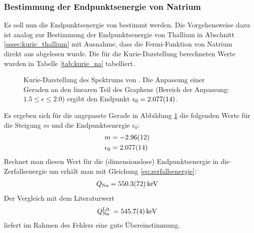 \documentclass[11pt, a4paper]{article}
\numberwithin{equation}{section}
\begin{document}
\subsubsection{Bestimmung der Endpunktsenergie von Natrium}
Es soll nun die Endpunktsenergie von  bestimmt werden.
Die Vorgehensweise dazu ist analog zur Bestimmung der Endpunktsenergie von Thallium in Abschnitt \ref{sssec:kurie_thallium} mit Ausnahme, dass die Fermi-Funktion von Natrium direkt aus \cite{riezler} abgelesen wurde.
Die für die Kurie-Darstellung berechneten Werte wurden in Tabelle \ref{tab:kurie_na} tabelliert.
\begin{figure}[h]
	\centering
	
	\caption{Kurie-Darstellung des Spektrums von . Die Anpassung einer Geraden an den linearen Teil des Graphens (Bereich der Anpassung: $\num{1.5} \leq \epsilon \leq {2.0}$) ergibt den Endpunkt $\epsilon_0 = \num{2.077 +- 0.014}$.}
	\label{fig:natrium_kurie}
\end{figure}
Es ergeben sich für die angepasste Gerade in Abbildung \ref{fig:natrium_kurie} die folgenden Werte für die Steigung $m$ und die Endpunktsenergie $\epsilon_0$:
\begin{align*}
	m &= \num{-2.96+- 0.12} \\
	\epsilon_0 &= \num{2.077 +- 0.014}
\end{align*}
Rechnet man diesen Wert für die (dimensionslose) Endpunktsenergie in die Zerfallsenergie um erhält man mit Gleichung \ref{eq:zerfallsenergie}:
\begin{align*}
Q_\mathrm{Na} = \SI{550.3+-7.2}{\kilo\electronvolt}
\end{align*}
Der Vergleich mit dem Literaturwert \cite{na_literatur}
\begin{align*}
	Q^{\mathrm{Lit.}}_\mathrm{Na} = \SI{545.7 +- 0.4}{\kilo\electronvolt}
\end{align*}
liefert im Rahmen des Fehlers eine gute Übereinstimmung.
\FloatBarrier
\end{document}
